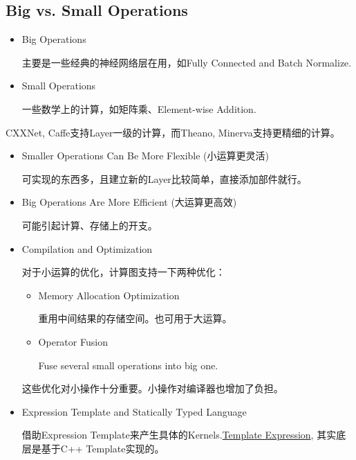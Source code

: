 \subsection{Big vs. Small Operations}

\begin{itemize}
\item Big Operations

主要是一些经典的神经网络层在用，如Fully Connected and Batch Normalize.

\item Small Operations

一些数学上的计算，如矩阵乘、Element-wise Addition.

\end{itemize}

CXXNet, Caffe支持Layer一级的计算，而Theano, Minerva支持更精细的计算。

\begin{itemize}
\item Smaller Operations Can Be More Flexible (小运算更灵活)

可实现的东西多，且建立新的Layer比较简单，直接添加部件就行。

\item Big Operations Are More Efficient (大运算更高效)

可能引起计算、存储上的开支。

\item Compilation and Optimization

对于小运算的优化，计算图支持一下两种优化：
\begin{itemize}
\item Memory Allocation Optimization

重用中间结果的存储空间。也可用于大运算。

\item Operator Fusion

Fuse several small operations into big one.

\end{itemize}

这些优化对小操作十分重要。小操作对编译器也增加了负担。

\item Expression Template and Statically Typed Language

借助Expression Template来产生具体的Kernels.\href{https://github.com/dmlc/mshadow/blob/master/guide/exp-template/README.md}{Template Expression}, 其实底层是基于C++ Template实现的。

\end{itemize}


